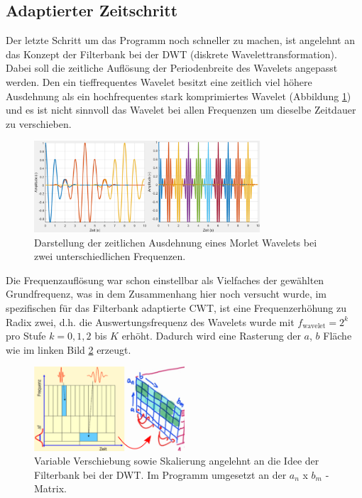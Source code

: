 \subsection{Adaptierter Zeitschritt
	\label{wavelets:subsection:AdaptierterZeitschritt}}
Der letzte Schritt um das Programm noch schneller zu machen, ist angelehnt an das Konzept der Filterbank bei der DWT (diskrete Wavelettransformation). Dabei soll die zeitliche Auflösung der Periodenbreite des Wavelets angepasst werden. Den ein tieffrequentes Wavelet besitzt eine zeitlich viel höhere Ausdehnung als ein hochfrequentes stark komprimiertes Wavelet (Abbildung \ref{wavelet:fig:adaptedShift_b}) und es ist nicht sinnvoll das Wavelet bei allen Frequenzen um dieselbe Zeitdauer zu verschieben.

\begin{figure}
	\centering
	\includegraphics[width=0.75\textwidth]{papers/wavelets/images/15-1_adaptedShift-b.png}
	\caption{Darstellung der zeitlichen Ausdehnung eines Morlet Wavelets bei zwei unterschiedlichen Frequenzen.}
	\label{wavelet:fig:adaptedShift_b}
\end{figure}

Die Frequenzauflösung war schon einstellbar als Vielfaches der gewählten Grundfrequenz, was in dem Zusammenhang hier noch versucht wurde, im spezifischen für das Filterbank adaptierte CWT, ist eine Frequenzerhöhung zu Radix zwei, d.h. die Auswertungsfrequenz des Wavelets wurde mit $f_\text{wavelet} = 2^k$ pro Stufe $k = 0, 1, 2$ bis $K$ erhöht. Dadurch wird eine Rasterung der $a$, $b$ Fläche wie im linken Bild \ref{wavelet:fig:adaptedFrequndTime} erzeugt.

\begin{figure}
	\centering
	\includegraphics[width=0.5\textwidth]{papers/wavelets/images/15-2_adaptedFrequndTime.png}
	\caption{Variable Verschiebung sowie Skalierung angelehnt an die Idee der Filterbank bei der DWT. Im Programm umgesetzt an der $a_n$ x $b_m$ - Matrix.}
	\label{wavelet:fig:adaptedFrequndTime}
\end{figure}

